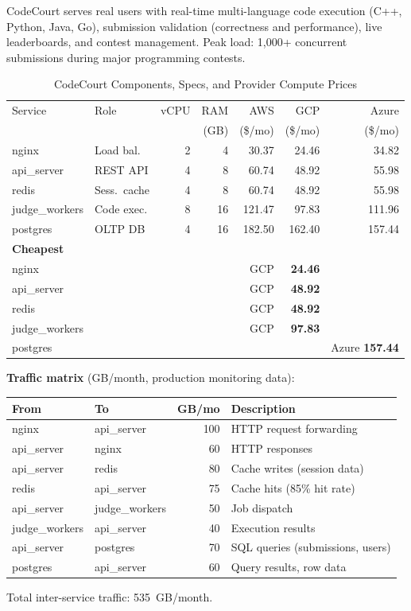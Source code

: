 \documentclass[10pt,journal]{IEEEtran}
\begin{document}
CodeCourt serves real users with real-time multi-language code execution
(C++, Python, Java, Go), submission validation (correctness and performance),
live leaderboards, and contest management.
Peak load: 1{,}000+ concurrent submissions during major programming contests.

\begin{table}[ht]
\centering
\caption{CodeCourt Components, Specs, and Provider Compute Prices}
\label{tab:cc_specs}
\setlength{\tabcolsep}{3pt}
\begin{tabular}{llrrrrr}
\toprule
Service & Role & vCPU & RAM & AWS & GCP & Azure\\
& & & (GB) & (\$/mo) & (\$/mo) & (\$/mo)\\
\midrule
nginx & Load bal. & 2 & 4 & 30.37 & 24.46 & 34.82\\
api\_server & REST API & 4 & 8 & 60.74 & 48.92 & 55.98\\
redis & Sess.~cache & 4 & 8 & 60.74 & 48.92 & 55.98\\
judge\_workers & Code exec. & 8 & 16 & 121.47 & 97.83 & 111.96\\
postgres & OLTP DB & 4 & 16 & 182.50 & 162.40 & 157.44\\
\midrule
\textbf{Cheapest} & & & & & & \\
nginx         & & & & GCP & \textbf{24.46} & \\
api\_server   & & & & GCP & \textbf{48.92} & \\
redis         & & & & GCP & \textbf{48.92} & \\
judge\_workers& & & & GCP & \textbf{97.83} & \\
postgres      & & & & & & Azure \textbf{157.44}\\
\bottomrule
\end{tabular}
\end{table}

\textbf{Traffic matrix} (GB/month, production monitoring data):
\begin{center}\footnotesize
\begin{tabular}{llrl}
\toprule
From & To & GB/mo & Description\\
\midrule
nginx         & api\_server  & 100 & HTTP request forwarding\\
api\_server   & nginx        & 60  & HTTP responses\\
api\_server & redis & 80 & Cache writes (session data)\\
redis & api\_server & 75 & Cache hits (85\% hit rate)\\
api\_server & judge\_workers & 50 & Job dispatch\\
judge\_workers & api\_server & 40 & Execution results\\
api\_server   & postgres     & 70  & SQL queries (submissions, users)\\
postgres      & api\_server  & 60  & Query results, row data\\
\bottomrule
\end{tabular}
\end{center}
Total inter-service traffic: 535~GB/month.
\end{document}
